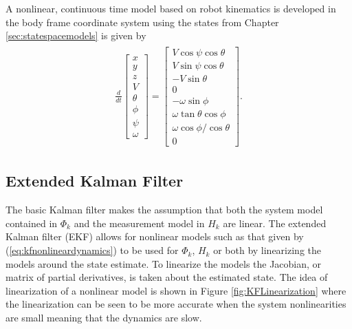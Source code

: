 A nonlinear, continuous time model based on robot kinematics is developed in the body frame coordinate system using the states from Chapter \ref{sec:statespacemodels} is given by
\begin{align}
\label{eq:kfnonlineardynamics}
\begin{split}
\frac{d}{dt}\left[\begin{array}{c}
x \\ y \\ z \\ V \\ \theta \\ \phi \\ \psi \\ \omega
\end{array}\right] =
\left[\begin{array}{c}
V\cos\psi\cos\theta \\
V\sin\psi\cos\theta \\
-V\sin\theta \\
0 \\
-\omega\sin\phi \\
\omega\tan\theta\cos\phi \\
\omega\cos\phi/\cos\theta \\
0
\end{array}\right].
\end{split}
\end{align}

\subsection{Extended Kalman Filter}
\label{sec:extendedkf}
The basic Kalman filter makes the assumption that both the system model contained in $\Phi_k$ and the measurement model in $H_k$ are linear. The extended Kalman filter (EKF) allows for nonlinear models such as that given by (\ref{eq:kfnonlineardynamics}) to be used for $\Phi_k$, $H_k$ or both by linearizing the models around the state estimate. To linearize the models the Jacobian, or matrix of partial derivatives, is taken about the estimated state. The idea of linearization of a nonlinear model is shown in Figure \ref{fig:KFLinearization} where the linearization can be seen to be more accurate when the system nonlinearities are small meaning that the dynamics are slow.

